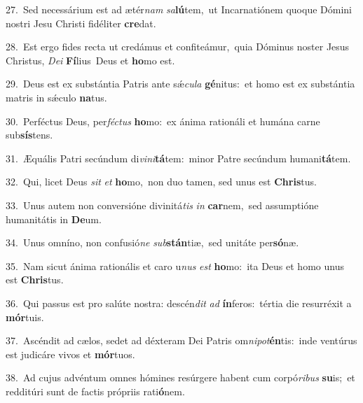{\numbfont\textcolor{\numbcolor}{27.}}~Sed necessárium est ad ætér\textit{nam} \textit{sa}\-\textbf{lú}tem,~\star ut Incarnatiónem quoque Dómini nostri Jesu Christi fidéliter \textbf{cre}\-dat.\par
{\numbfont\textcolor{\numbcolor}{28.}}~Est ergo fides recta ut credámus et confiteámur,~\dagger quia Dóminus noster Jesus Christus, \textit{De}\-\textit{i} \textbf{Fí}\-lius~\star Deus et \textbf{ho}\-mo est.\par
{\numbfont\textcolor{\numbcolor}{29.}}~Deus est ex substántia Patris ante sǽ\-\textit{cu}\-\textit{la} \textbf{gé}\-nitus:~\star et homo est ex substántia matris in sǽculo \textbf{na}\-tus.\par
{\numbfont\textcolor{\numbcolor}{30.}}~Perféctus Deus, per\-\textit{féc}\-\textit{tus} \textbf{ho}\-mo:~\star ex ánima rationáli et humána carne sub\-\textbf{sís}\-tens.\par
{\numbfont\textcolor{\numbcolor}{31.}}~Æquális Patri secúndum di\-\textit{vi}\-\textit{ni}\textbf{tá}tem:~\star minor Patre secúndum humani\-\textbf{tá}\-tem.\par
{\numbfont\textcolor{\numbcolor}{32.}}~Qui, licet Deus \textit{sit} \textit{et} \textbf{ho}\-mo,~\star non duo tamen, sed unus est \textbf{Chris}\-tus.\par
{\numbfont\textcolor{\numbcolor}{33.}}~Unus autem non conversióne divinitá\textit{tis} \textit{in} \textbf{car}\-nem,~\star sed assumptióne humanitátis in \textbf{De}\-um.\par
{\numbfont\textcolor{\numbcolor}{34.}}~Unus omníno, non confusió\textit{ne} \textit{sub}\-\textbf{stán}tiæ,~\star sed unitáte per\-\textbf{só}\-næ.\par
{\numbfont\textcolor{\numbcolor}{35.}}~Nam sicut ánima rationális et caro u\textit{nus} \textit{est} \textbf{ho}\-mo:~\star ita Deus et homo unus est \textbf{Chris}\-tus.\par
{\numbfont\textcolor{\numbcolor}{36.}}~Qui passus est pro salúte nostra: descén\textit{dit} \textit{ad} \textbf{ín}\-feros:~\star tértia die resurréxit a \textbf{mór}\-tuis.\par
{\numbfont\textcolor{\numbcolor}{37.}}~Ascéndit ad cælos, sedet ad déxteram Dei Patris om\-\textit{ni}\-\textit{pot}\textbf{én}tis:~\star inde ventúrus est judicáre vivos et \textbf{mór}\-tuos.\par
{\numbfont\textcolor{\numbcolor}{38.}}~Ad cujus advéntum omnes hómines resúrgere habent cum corpó\-\textit{ri}\-\textit{bus} \textbf{su}\-is;~\star et redditúri sunt de factis própriis rati\-\textbf{ó}\-nem.\par
